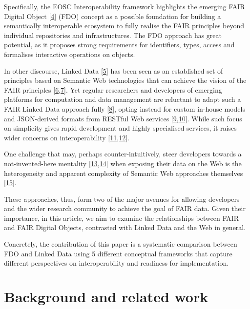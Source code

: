 Specifically, the EOSC Interoperability framework highlights the emerging FAIR Digital Object {[}\protect\hyperlink{ref-IHLT6hye}{4}{]} (FDO) concept as a possible foundation for building a semantically interoperable ecosystem to fully realise the FAIR principles beyond individual repositories and infrastructures. The FDO approach has great potential, as it proposes strong requirements for identifiers, types, access and formalises interactive operations on objects.

In other discourse, Linked Data {[}\protect\hyperlink{ref-19s3yyxDn}{5}{]} has been seen as an established set of principles based on Semantic Web technologies that can achieve the vision of the FAIR principles {[}\protect\hyperlink{ref-GJHYN6xW}{6},\protect\hyperlink{ref-EJDjHrUv}{7}{]}. Yet regular researchers and developers of emerging platforms for computation and data management are reluctant to adapt such a FAIR Linked Data approach fully {[}\protect\hyperlink{ref-jHwttlTs}{8}{]}, opting instead for custom in-house models and JSON-derived formats from RESTful Web services {[}\protect\hyperlink{ref-99MS5xE0}{9},\protect\hyperlink{ref-J2H8yssV}{10}{]}. While such focus on simplicity gives rapid development and highly specialised services, it raises wider concerns on interoperability {[}\protect\hyperlink{ref-DNTCUjpC}{11},\protect\hyperlink{ref-Pa67pUtR}{12}{]}.

One challenge that may, perhaps counter-intuitively, steer developers towards a not-invented-here mentality {[}\protect\hyperlink{ref-uxWjmlio}{13},\protect\hyperlink{ref-v0WwFHgT}{14}{]} when exposing their data on the Web is the heterogeneity and apparent complexity of Semantic Web approaches themselves {[}\protect\hyperlink{ref-5V3GqSzR}{15}{]}.

These approaches, thus, form two of the major avenues for allowing developers and the wider research community to achieve the goal of FAIR data. Given their importance, in this article, we aim to examine the relationships between FAIR and FAIR Digital Objects, contrasted with Linked Data and the Web in general.

Concretely, the contribution of this paper is a systematic comparison between FDO and Linked Data using 5 different conceptual frameworks that capture different perspectives on interoperability and readiness for implementation.

\hypertarget{sec:background}{%
\section{Background and related work}\label{sec:background}}

